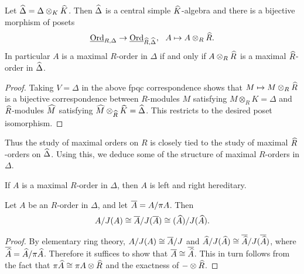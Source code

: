 \begin{prop}
Let $\widehat\Delta = \Delta\otimes_K\widehat K$.  Then $\widehat\Delta$ is a central simple $\widehat{K}$-algebra and there is a bijective morphism of posets
$$\Ord_{R,\Delta}\rightarrow\Ord_{\wh{R},\wh\Delta},\ \ A\mapsto A\otimes_R\wh{R}.$$
In particular $A$ is a maximal $R$-order in $\Delta$ if and only if $A\otimes_R\widehat{R}$ is a maximal $\widehat{R}$-order in $\widehat{\Delta}$.
\end{prop}
\begin{proof}
Taking $V = \Delta$ in the above fpqc correspondence shows that $M\mapsto M\otimes_R\widehat R$ is a bijective correspondence between $R$-modules $M$ satisfying $M\otimes_R K = \Delta$ and $\widehat R$-modules $\widehat M$ satisfying $\widehat M\otimes_{\widehat R}\widehat K = \widehat \Delta$.  This restricts to the desired poset isomorphism.
\end{proof}
Thus the study of maximal orders on $R$ is closely tied to the study of maximal $\widehat R$-orders on $\widehat \Delta$.  Using this, we deduce some of the structure of maximal $R$-orders in $\Delta$.

\begin{cor}
If $A$ is a maximal $R$-order in $\Delta$, then $A$ is left and right hereditary.
\end{cor}

\begin{prop}
Let $A$ be an $R$-order in $\Delta$, and let $\overline{A} = A/\pi A$.  Then
$$A/J(A)\cong \overline{A}/J(\overline{A})\cong (\widehat A)/J(\widehat A).$$
\end{prop}
\begin{proof}
By elementary ring theory, $A/J(A)\cong \overline{A}/J$ and $\widehat A/J(\widehat A)\cong \overline{\widehat A}/J(\overline{\widehat A})$, where $\overline{\widehat A} = \widehat A/\pi\widehat A$.  Therefore it suffices to show that $\overline{A}\cong\overline{\widehat A}$.  This in turn follows from the fact that $\pi\widehat A \cong \pi A \otimes\widehat R$ and the exactness of $-\otimes\widehat R$.
\end{proof}

